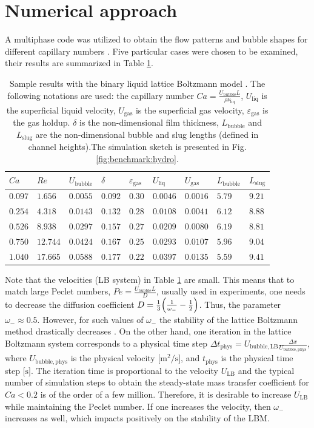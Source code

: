 \documentclass[review,12pt]{elsarticle}
\newcommand{\lbubble}{L_{\mathrm{bubble}}}
\newcommand{\lslug}{L_{\mathrm{slug}}}
\newcommand{\ububble}{U_{\mathrm{bubble}}}
\newcommand{\uliq}{U_{\mathrm{liq}}}
\newcommand{\ugas}{U_{\mathrm{gas}}}
\newcommand{\omegaminus}{\omega_{-}}
\newcommand{\holdup}{\varepsilon_{\mathrm{gas}}}
\begin{document}
\section{Numerical approach}
\label{sec:numerics}
A multiphase code was utilized to obtain the flow patterns and bubble shapes for different capillary numbers
\cite{kuzmin-binary2d}. Five particular cases were chosen to be examined, their results are summarized
in Table \ref{table:capillary:cases}. 
\begin{table}[htb!]
\begin{tabularx}{\textwidth}{|X|X|X|X|X|X|X|X|X|}
\hline
$Ca$    &$Re$     &$\ububble$ &$\delta$&$\holdup$
&$\uliq$&$\ugas$&$\lbubble$&$\lslug$\\
\hline
$0.097$ &$1.656$  &$0.0055$ &$0.092$ &$0.30$ &$0.0046$&$0.0016$&$5.79$&$9.21$\\ 
$0.254$ &$4.318$  &$0.0143$ &$0.132$ &$0.28$ &$0.0108$&$0.0041$&$6.12$&$8.88$\\ 
$0.526$ &$8.938$  &$0.0297$ &$0.157$ &$0.27$ &$0.0209$&$0.0080$&$6.19$&$8.81$\\
$0.750$ &$12.744$ &$0.0424$ &$0.167$ &$0.25$ &$0.0293$&$0.0107$&$5.96$&$9.04$\\
$1.040$ &$17.665$ &$0.0588$ &$0.177$ &$0.22$ &$0.0397$&$0.0135$&$5.59$&$9.41$\\
\hline
\end{tabularx}
\caption{Sample results with the binary liquid lattice Boltzmann model \cite{kuzmin-binary2d}. The
following notations are used: the capillary number $Ca=\frac{\ububble L}{\rho \nu_{\mathrm{liq}}}$, $\uliq$ is the superficial liquid velocity, $\ugas$ is the
superficial gas velocity, $\holdup$ is the gas holdup. $\delta$ is the
non-dimensional film thickness, $\lbubble$ and $\lslug$ are the non-dimensional bubble and slug lengths (defined in channel heights).The simulation sketch is presented in Fig.
\ref{fig:benchmark:hydro}. \label{table:capillary:cases}}
\end{table}
Note that the velocities (LB system) in Table \ref{table:capillary:cases} are small. This means that to
match large Peclet numbers, $Pe=\frac{\ububble L}{D}$, usually used in experiments, one needs to decrease the diffusion coefficient
$D=\frac{1}{3}\Bigl(\frac{1}{\omegaminus}-\frac{1}{2}\Bigr)$. Thus, the parameter $\omegaminus\approx 0.5$. However, for such values of 
$\omegaminus$ the stability of the lattice Boltzmann method drastically decreases
\cite{kuzmin-d1q3}. On the other hand, one iteration in the lattice Boltzmann system corresponds
to a physical time step  $\Delta t_{\mathrm{phys}}=U_{\mathrm{bubble,LB}} \frac{\Delta
x}{U_{\mathrm{bubble,phys}}}$, {\color{red} where $U_{\mathrm{bubble,phys}}$ is the physical velocity $\bigl[\mathrm{m^2}/\mathrm{s}\bigr]$}, and $t_{\mathrm{phys}}$ is the physical time step $\bigl[\mathrm{s}\bigr]$. The iteration time is proportional to the velocity $U_{\mathrm{LB}}$
and the typical number of simulation steps to obtain the steady-state mass transfer coefficient for
$Ca<0.2$ is of the order of a few million. Therefore, it is desirable to increase    $U_{\mathrm{LB}}$
while maintaining the Peclet number. If one increases the velocity, then
$\omegaminus$ increases as well, which impacts positively on the stability of the LBM.
 
\end{document}
